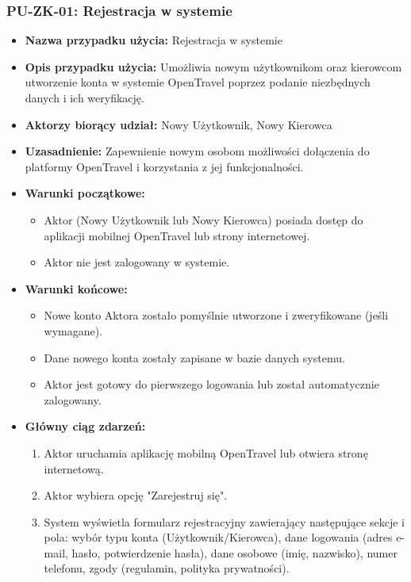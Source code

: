 \documentclass[a4paper,12pt]{article}
\begin{document}
\subsubsection{PU-ZK-01: Rejestracja w systemie}
\begin{itemize}
    \item \textbf{Nazwa przypadku użycia:} Rejestracja w systemie
    \item \textbf{Opis przypadku użycia:} Umożliwia nowym użytkownikom oraz kierowcom utworzenie konta w systemie OpenTravel poprzez podanie niezbędnych danych i ich weryfikację.
    \item \textbf{Aktorzy biorący udział:} Nowy Użytkownik, Nowy Kierowca
    \item \textbf{Uzasadnienie:} Zapewnienie nowym osobom możliwości dołączenia do platformy OpenTravel i korzystania z jej funkcjonalności.
    \item \textbf{Warunki początkowe:}
        \begin{itemize}
            \item Aktor (Nowy Użytkownik lub Nowy Kierowca) posiada dostęp do aplikacji mobilnej OpenTravel lub strony internetowej.
            \item Aktor nie jest zalogowany w systemie.
        \end{itemize}
    \item \textbf{Warunki końcowe:}
        \begin{itemize}
            \item Nowe konto Aktora zostało pomyślnie utworzone i zweryfikowane (jeśli wymagane).
            \item Dane nowego konta zostały zapisane w bazie danych systemu.
            \item Aktor jest gotowy do pierwszego logowania lub został automatycznie zalogowany.
        \end{itemize}
    \item \textbf{Główny ciąg zdarzeń:}
        \begin{enumerate}
            \item Aktor uruchamia aplikację mobilną OpenTravel lub otwiera stronę internetową.
            \item Aktor wybiera opcję "Zarejestruj się".
            \item System wyświetla formularz rejestracyjny zawierający następujące sekcje i pola: wybór typu konta (Użytkownik/Kierowca), dane logowania (adres e-mail, hasło, potwierdzenie hasła), dane osobowe (imię, nazwisko), numer telefonu, zgody (regulamin, polityka prywatności).

\end{enumerate}
\end{itemize}
\end{document}
